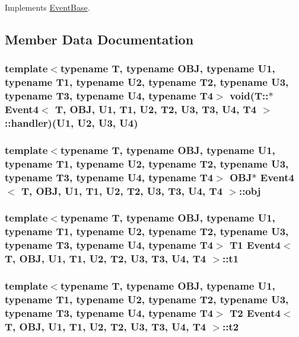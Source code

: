 Implements \hyperlink{classEventBase_121ca64dec88c8d9589c064b0060d037}{EventBase}.

\subsection{Member Data Documentation}
\hypertarget{classEvent4_13bc21430e9b5e4f41d9df447f455a57}{
\subsubsection[{handler}]{\setlength{\rightskip}{0pt plus 5cm}template$<$typename T, typename OBJ, typename U1, typename T1, typename U2, typename T2, typename U3, typename T3, typename U4, typename T4$>$ void(T::$\ast$ {\bf Event4}$<$ T, OBJ, U1, T1, U2, T2, U3, T3, U4, T4 $>$::{\bf handler})(U1, U2, U3, U4)}}
\label{classEvent4_13bc21430e9b5e4f41d9df447f455a57}


\hypertarget{classEvent4_214fd485cf467a8b3e7f48de2cce982a}{
\subsubsection[{obj}]{\setlength{\rightskip}{0pt plus 5cm}template$<$typename T, typename OBJ, typename U1, typename T1, typename U2, typename T2, typename U3, typename T3, typename U4, typename T4$>$ OBJ$\ast$ {\bf Event4}$<$ T, OBJ, U1, T1, U2, T2, U3, T3, U4, T4 $>$::{\bf obj}}}
\label{classEvent4_214fd485cf467a8b3e7f48de2cce982a}


\hypertarget{classEvent4_71f46004ef408ffe9c15d8eb4c295e9e}{
\subsubsection[{t1}]{\setlength{\rightskip}{0pt plus 5cm}template$<$typename T, typename OBJ, typename U1, typename T1, typename U2, typename T2, typename U3, typename T3, typename U4, typename T4$>$ T1 {\bf Event4}$<$ T, OBJ, U1, T1, U2, T2, U3, T3, U4, T4 $>$::{\bf t1}}}
\label{classEvent4_71f46004ef408ffe9c15d8eb4c295e9e}


\hypertarget{classEvent4_61865aa3d8420f7e3cefab5dcb750f03}{
\subsubsection[{t2}]{\setlength{\rightskip}{0pt plus 5cm}template$<$typename T, typename OBJ, typename U1, typename T1, typename U2, typename T2, typename U3, typename T3, typename U4, typename T4$>$ T2 {\bf Event4}$<$ T, OBJ, U1, T1, U2, T2, U3, T3, U4, T4 $>$::{\bf t2}}}
\label{classEvent4_61865aa3d8420f7e3cefab5dcb750f03}


